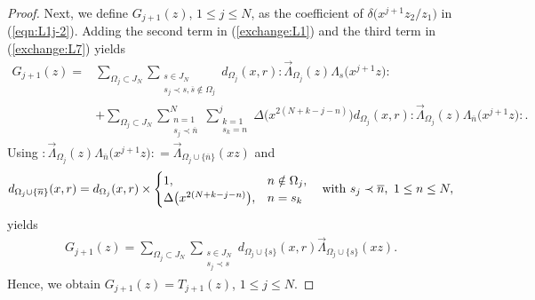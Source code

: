 \documentclass[pdftex]{sigma}
\numberwithin{equation}{section}
\begin{document}
\begin{proof}
Next, we define
${G}_{j+1}(z)$, $1\leq j \leq N$, as the coefficient of
$\delta\big(x^{j+1}z_2/z_1\big)$ in (\ref{eqn:L1j-2}).
Adding the second term in (\ref{exchange:L1}) and
the third term in (\ref{exchange:L7}) yields
\begin{align*}
{G}_{j+1}(z)=&\sum_{\Omega_j \subset J_N}
\sum\limits_{\substack{s \in J_N\\s_j \prec s, \overline{s} \notin \Omega_j}}
d_{\Omega_{j}}(x,r)
{:}\overrightarrow{\Lambda}_{\Omega_{j}}(z)\Lambda_s\big(x^{j+1}z\big){:}
\\
&+
\sum_{\Omega_j \subset J_N}
\sum\limits_{\substack{n=1\\s_j \prec \overline{n}}}^N
\sum\limits_{\substack{k=1\\s_k=n}}^j
\Delta\big(x^{2(N+k-j-n)}\big) d_{\Omega_{j}}(x,r)
{:}\overrightarrow{\Lambda}_{\Omega_{j}}(z)\Lambda_{\overline{n}}\big(x^{j+1}z\big){:}.
\end{align*}
Using
${:}\overrightarrow{\Lambda}_{\Omega_{j}}(z)\Lambda_{\overline{n}}\big(x^{j+1}z\big){:}
=\overrightarrow{\Lambda}_{\Omega_{j}\cup \{\overline{n}\}}(xz)$
and
\begin{gather*}
d_{{\Omega_{j}\cup \{\overline{n}\}}}(x,r)=
d_{{\Omega_{j}}}(x,r)\times
\begin{cases}
1,& n \notin \Omega_j,\\
\Delta\big(x^{{2(N+k-j-n)}}\big),&n=s_k
\end{cases}\quad
{\rm with}~s_j \prec \overline{n},\ 1\leq n \leq N,
\end{gather*}
yields
\begin{gather*}
{G}_{j+1}(z)=
\sum_{\Omega_j \subset J_N}
\sum\limits_{\substack{s \in J_N
\\s_j \prec s}}d_{\Omega_j\cup \{s\}}(x,r)
\overrightarrow{\Lambda}_{\Omega_j \cup \{s\}}(xz).
\end{gather*}
Hence, we obtain ${G_{j+1}(z)}=T_{j+1}(z)$, $1\leq j \leq N$.


\end{proof}
\end{document}
